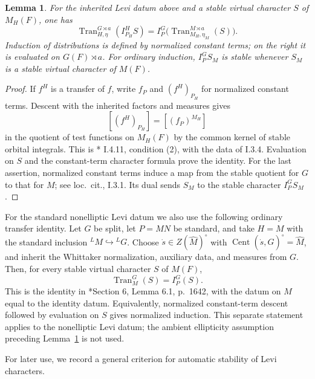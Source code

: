 \documentclass[12pt]{amsart}
\theoremstyle{definition}
\theoremstyle{plain}
\newtheorem{lemma}[definition]{Lemma}
\theoremstyle{remark}
\DeclareMathOperator{\Cent}{Cent}%
\numberwithin{equation}{section}
\begin{document}
\begin{lemma}\label{lem:induction-transfer}
For the inherited Levi datum above and a stable virtual character
$S$ of $M_H(F)$, one has
\[
 \operatorname{Tran}_{H,\eta}^{G \rtimes a}(I_{P_H}^H S)
   = I_P^G\bigl(\operatorname{Tran}_{M_H,\eta_M}^{M \rtimes a}(S)\bigr).
\]
Induction of distributions is defined by normalized constant terms;
on the right it is evaluated on $G(F)\rtimes a$.
For ordinary induction, $I_P^G S_M$ is stable whenever $S_M$ is a
stable virtual character of $M(F)$.
\end{lemma}
\begin{proof}
If $f^H$ is a transfer of $f$, write $f_P$ and $(f^H)_{P_H}$ for
normalized constant terms. Descent with the inherited factors and
measures gives
\[
 [(f^H)_{P_H}]=[(f_P)^{M_H}]
\]
in the quotient of test functions on $M_H(F)$ by the common kernel
of stable orbital integrals. This is
\cite{MoeglinWaldspurger2016-StabilisationFormuleTracesTordue1}*{
I.4.11, condition (2)}, with the data of I.3.4.
Evaluation on $S$ and the constant-term character formula prove the
identity. For the last assertion, normalized constant terms induce a
map from the stable quotient for $G$ to that for $M$; see loc.~cit.,
I.3.1. Its dual sends $S_M$ to the stable character $I_P^G S_M$.
\end{proof}

For the standard nonelliptic Levi datum we also use the following
ordinary transfer identity. Let $G$ be split, let $P=MN$ be standard,
and take $H=M$ with the standard inclusion ${}^LM\hookrightarrow{}^LG$.
Choose $\dot s\in Z(\widehat M)^\circ$ with
$\Cent(\dot s,\widehat G)^\circ=\widehat M$, and inherit the
Whittaker normalization, auxiliary data, and measures from $G$.
Then, for every stable virtual character $S$ of $M(F)$,
\[
 \operatorname{Tran}_{M}^{G}(S)=I_P^G(S).
\]
This is the identity in
\cite{Hiraga2004-FunctorialityZelevinskiInvolutions}*{Section 6,
Lemma 6.1, p.~1642}, with the datum on $M$ equal to the identity
datum. Equivalently, normalized constant-term descent followed by
evaluation on $S$ gives normalized induction. This separate statement
applies to the nonelliptic Levi datum; the ambient ellipticity
assumption preceding Lemma~\ref{lem:induction-transfer} is not used.

For later use, we record a general criterion for automatic stability
of Levi characters.
\end{document}
